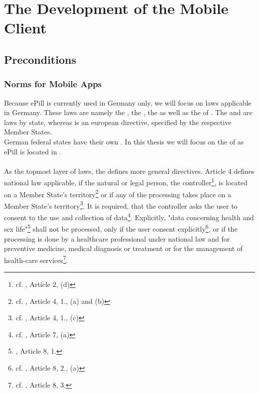 \section{The Development of the Mobile Client}
\subsection{Preconditions}
\label{subsec:Preconditions}
\subsubsection{Norms for Mobile Apps}
\label{subsubsec:Norms}
Because ePill is currently used in Germany only, we will focus on laws applicable in Germany. These laws are namely the \TKGns, the \TMGns, the \REG as well as the \DPA of \NRWns. The \TKG and \TMG are laws by state, whereas \REG is an european directive, specified by the respective Member States. 
\\
German federal states have their own \DPAsns. In this thesis we will focus on the \DPA of \NRW as ePill is located in \NRWns.
\\
\\
As the topmost layer of laws, the \REG defines more general directives. Article 4 defines national law applicable, if the natural or legal person, the controller\footnote{cf. \cite{TheEuropeanParliamentandtheCounciloftheEuropeanUnion.24.10.1995}, Article 2, (d)}, is located on a Member State's territory\footnote{cf. \cite{TheEuropeanParliamentandtheCounciloftheEuropeanUnion.24.10.1995}, Article 4, 1., (a) and (b)} or if any of the processing takes place on a Member State's territory\footnote{cf. \cite{TheEuropeanParliamentandtheCounciloftheEuropeanUnion.24.10.1995}, Article 4, 1., (c)}. It is required, that the controller asks the user to consent to the use and collection of data\footnote{cf. \cite{TheEuropeanParliamentandtheCounciloftheEuropeanUnion.24.10.1995}, Article 7, (a)}. Explicitly, "data concerning health and sex life"\footnote{\cite{TheEuropeanParliamentandtheCounciloftheEuropeanUnion.24.10.1995}, Article 8, 1.} shall not be processed, only if the user consent explicitly\footnote{cf. \cite{TheEuropeanParliamentandtheCounciloftheEuropeanUnion.24.10.1995}, Article 8, 2., (a)}, or if the processing is done by a healthcare professional under national law and for preventive medicine, medical diagnosis or treatment or for the management of health-care services\footnote{cf. \cite{TheEuropeanParliamentandtheCounciloftheEuropeanUnion.24.10.1995}, Article 8, 3.}. 
\\
